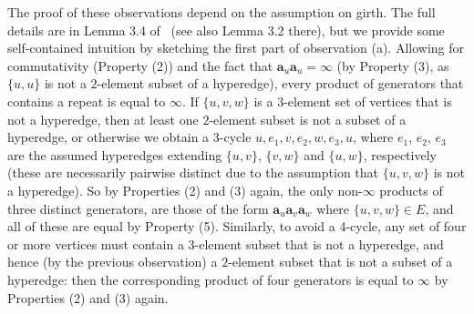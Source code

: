 \documentclass[eqnor,reqno]{amsart}
\theoremstyle{plain}
\theoremstyle{definition}
\begin{document}
The proof of these observations depend on the assumption on girth.  The full details are in Lemma 3.4 of~\cite{JRZ} (see also Lemma 3.2 there), but we provide some self-contained intuition by sketching the first part of observation (a).
Allowing for commutativity (Property (2)) and the fact that $\mathbf{a}_{u}\mathbf{a}_u=\infty$ (by Property (3), as $\{u,u\}$ is not a $2$-element subset of a hyperedge), every product of generators that contains a repeat is equal to $\infty$.  
If $\{u,v,w\}$ is a $3$-element set of vertices that is not a hyperedge, then at least one $2$-element subset is not a subset of a hyperedge, or otherwise we obtain a $3$-cycle $u,e_1,v,e_2,w,e_3,u$, where $e_1$, $e_2$, $e_3$ are the assumed hyperedges extending $\{u,v\}$, $\{v,w\}$ and $\{u,w\}$, respectively (these are necessarily pairwise distinct due to the assumption that $\{u,v,w\}$ is not a hyperedge).  
So by Properties (2) and (3) again,  the only non-$\infty$ products of three distinct generators, are those of the form $\mathbf{a}_u\mathbf{a}_v\mathbf{a}_w$ where $\{u,v,w\}\in E$, and all of these are equal by Property (5).  
Similarly, to avoid a 4-cycle, any set of four or more vertices must contain a $3$-element subset that is not a hyperedge, and hence  (by the previous observation) a $2$-element subset that is not a subset of a hyperedge: 
then the corresponding product of four generators is equal to $\infty$ by Properties (2) and (3) again.
\end{document}
